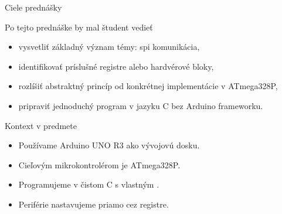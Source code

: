 
\begin{frame}{Ciele prednášky}
\begin{tukebox}{Po tejto prednáške by mal študent vedieť}
\begin{itemize}
    \item vysvetliť základný význam témy: spi komunikácia,
    \item identifikovať príslušné registre alebo hardvérové bloky,
    \item rozlíšiť abstraktný princíp od konkrétnej implementácie v ATmega328P,
    \item pripraviť jednoduchý program v jazyku C bez Arduino frameworku.
\end{itemize}
\end{tukebox}
\end{frame}

\begin{frame}{Kontext v predmete}
\begin{itemize}
    \item Používame Arduino UNO R3 ako vývojovú dosku.
    \item Cieľovým mikrokontrolérom je ATmega328P.
    \item Programujeme v čistom C s vlastným .
    \item Periférie nastavujeme priamo cez registre.
\end{itemize}
\end{frame}
